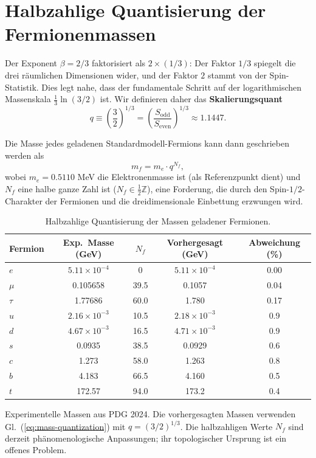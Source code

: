 \documentclass[12pt,a4paper]{article}
\begin{document}
	\section{Halbzahlige Quantisierung der Fermionenmassen}
	
	Der Exponent \(\beta = 2/3\) faktorisiert als \(2 \times (1/3)\): Der Faktor \(1/3\) spiegelt die drei räumlichen Dimensionen wider, und der Faktor \(2\) stammt von der Spin-Statistik.  Dies legt nahe, dass der fundamentale Schritt auf der logarithmischen Massenskala \(\frac{1}{3}\ln(3/2)\) ist.  Wir definieren daher das \textbf{Skalierungsquant}
	\begin{equation}
		q \equiv \left(\frac{3}{2}\right)^{1/3} = \left(\frac{S_{\mathrm{odd}}}{S_{\mathrm{even}}}\right)^{1/3} \approx 1.1447.
	\end{equation}
	
	Die Masse jedes geladenen Standardmodell-Fermions kann dann geschrieben werden als
	\begin{equation}
		\boxed{m_f = m_e \cdot q^{N_f}},
		\label{eq:mass-quantization}
	\end{equation}
	wobei \(m_e = 0.5110\) MeV die Elektronenmasse ist (als Referenzpunkt dient) und \(N_f\) eine halbe ganze Zahl ist (\(N_f \in \frac{1}{2}\mathbb{Z}\)), eine Forderung, die durch den Spin-\(1/2\)-Charakter der Fermionen und die dreidimensionale Einbettung erzwungen wird.
	
	\begin{table}[htbp]
		\centering
		\caption{Halbzahlige Quantisierung der Massen geladener Fermionen.}
		\label{tab:fermions}
		\begin{tabular}{l c c c c}
			\toprule
			Fermion & Exp.\ Masse (GeV) & \(N_f\) & Vorhergesagt (GeV) & Abweichung (\%) \\
			\midrule
			\(e\)   & \(5.11\times10^{-4}\) & 0      & \(5.11\times10^{-4}\) & 0.00 \\
			\(\mu\)  & 0.105658             & 39.5   & 0.1057               & 0.04 \\
			\(\tau\) & 1.77686              & 60.0   & 1.780                & 0.17 \\
			\(u\)   & \(2.16\times10^{-3}\) & 10.5   & \(2.18\times10^{-3}\) & 0.9 \\
			\(d\)   & \(4.67\times10^{-3}\) & 16.5   & \(4.71\times10^{-3}\) & 0.9 \\
			\(s\)   & 0.0935               & 38.5   & 0.0929               & 0.6 \\
			\(c\)   & 1.273                & 58.0   & 1.263                & 0.8 \\
			\(b\)   & 4.183                & 66.5   & 4.160                & 0.5 \\
			\(t\)   & 172.57               & 94.0   & 173.2                & 0.4 \\
			\bottomrule
		\end{tabular}
		\par\smallskip
		\footnotesize
		Experimentelle Massen aus PDG 2024.  Die vorhergesagten Massen verwenden Gl.~(\ref{eq:mass-quantization}) mit \(q = (3/2)^{1/3}\).  Die halbzahligen Werte \(N_f\) sind derzeit phänomenologische Anpassungen; ihr topologischer Ursprung ist ein offenes Problem.
	\end{table}
	
\end{document}
